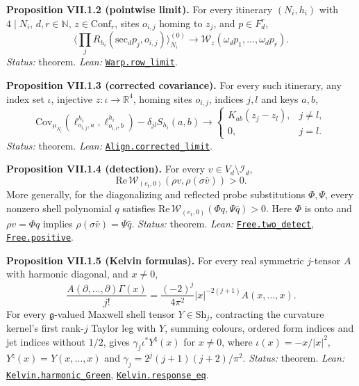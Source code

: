 \documentclass[
  letterpaper,
  11pt]{article}
\begin{document}
\textbf{Proposition VII.1.2 (pointwise limit).} For every itinerary
\((N_i,h_i)\) with \(4\mid N_i\), \(d,r\in\mathbb N\),
\(z\in\mathrm{Conf}_r\), sites \(o_{i,j}\) homing to \(z_j\), and
\(p\in F_d^r\),
\[\Big\langle\prod_jR_{h_i}(\mathrm{sec}_dp_j,o_{i,j})\Big\rangle^{(0)}_{N_i}\longrightarrow\mathcal W_z(\omega_dp_1,\ldots,\omega_dp_r).\]
\emph{Status:} theorem. \emph{Lean:}
\href{https://github.com/yang-mills-group/OpenAI-YM-20261028/blob/3456e5e75cf8d4cd558955a5c7638fba2d68f464/YM/Pert/Warp/Horizons.lean\#L65-L68}{\texttt{Warp.row\_limit}}.

\textbf{Proposition VII.1.3 (corrected covariance).} For every such
itinerary, any index set \(\iota\), injective \(z:\iota\to\mathbb R^4\),
homing sites \(o_{i,j}\), indices \(j,l\) and keys \(a,b\),
\[\mathrm{Cov}_{\mu_{N_i}}(\ell^{h_i}_{o_{i,j},a},\ell^{h_i}_{o_{i,l},b})-\delta_{jl}S_{h_i}(a,b)\longrightarrow\begin{cases}K_{ab}(z_j-z_l),&j\ne l,\\0,&j=l.\end{cases}\]
\emph{Status:} theorem. \emph{Lean:}
\href{https://github.com/yang-mills-group/OpenAI-YM-20261028/blob/3456e5e75cf8d4cd558955a5c7638fba2d68f464/YM/Pert/Align/Drivers.lean\#L39-L44}{\texttt{Align.corrected\_limit}}.

\textbf{Proposition VII.1.4 (detection).} For every
\(v\in V_d\setminus\mathcal I_d\),
\[\mathrm{Re}\,\mathcal W_{(e_{\mathrm t},0)}(\rho v,\rho(\sigma\bar v))>0.\]
More generally, for the diagonalizing and reflected probe substitutions
\(\Phi,\Psi\), every nonzero shell polynomial \(q\) satisfies
\(\mathrm{Re}\,\mathcal W_{(e_{\mathrm t},0)}(\Phi q,\Psi\bar q)>0\).
Here \(\Phi\) is onto and \(\rho v=\Phi q\) implies
\(\rho(\sigma\bar v)=\Psi\bar q\). \emph{Status:} theorem. \emph{Lean:}
\href{https://github.com/yang-mills-group/OpenAI-YM-20261028/blob/3456e5e75cf8d4cd558955a5c7638fba2d68f464/YM/Push/FINITE_DETECTION/TwoPoint.lean\#L151-L155}{\texttt{Free.two\_detect}},
\href{https://github.com/yang-mills-group/OpenAI-YM-20261028/blob/3456e5e75cf8d4cd558955a5c7638fba2d68f464/YM/Push/FINITE_DETECTION/TwoPoint.lean\#L132-L149}{\texttt{Free.positive}}.

\textbf{Proposition VII.1.5 (Kelvin formulas).} For every real symmetric
\(j\)-tensor \(A\) with harmonic diagonal, and \(x\ne0\),
\[\frac{A(\partial,\ldots,\partial)\Gamma(x)}{j!}=\frac{(-2)^j}{4\pi^2}|x|^{-2(j+1)}A(x,\ldots,x).\]
For every \(\mathfrak g\)-valued Maxwell shell tensor
\(Y\in\mathrm{Sh}_j\), contracting the curvature kernel's first
rank-\(j\) Taylor leg with \(Y\), summing colours, ordered form indices
and jet indices without \(1/2\), gives \(\gamma_j\iota^*Y^\natural(x)\)
for \(x\ne0\), where \(\iota(x)=-x/|x|^2\),
\(Y^\natural(x)=Y(x,\ldots,x)\) and \(\gamma_j=2^j(j+1)(j+2)/\pi^2\).
\emph{Status:} theorem. \emph{Lean:}
\href{https://github.com/yang-mills-group/OpenAI-YM-20261028/blob/3456e5e75cf8d4cd558955a5c7638fba2d68f464/YM/Push/FINITE_DETECTION/Harmonic.lean\#L157-L180}{\texttt{Kelvin.harmonic\_Green}},
\href{https://github.com/yang-mills-group/OpenAI-YM-20261028/blob/3456e5e75cf8d4cd558955a5c7638fba2d68f464/YM/Push/FINITE_DETECTION/Response.lean\#L172-L176}{\texttt{Kelvin.response\_eq}}.
\end{document}
